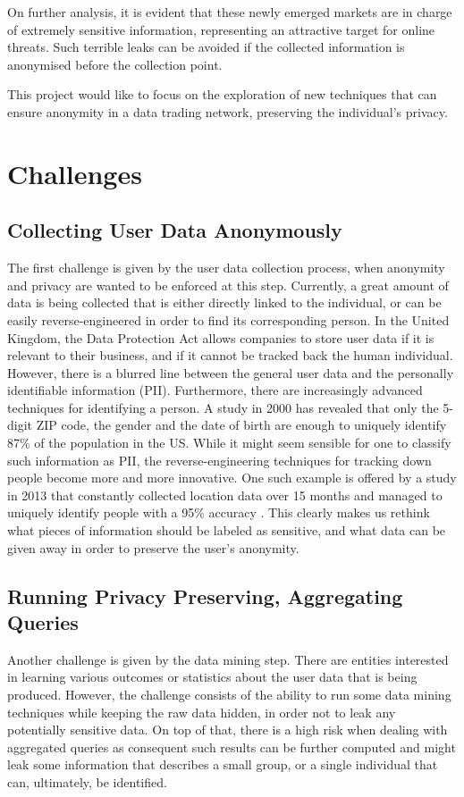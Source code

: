 On further analysis, it is evident that these newly emerged markets are in charge of extremely sensitive information, representing an attractive target for online threats. Such terrible leaks can be avoided if the collected information is anonymised before the collection point.

This project would like to focus on the exploration of new techniques that can ensure anonymity in a data trading network, preserving the individual's privacy.

\section{Challenges}
\subsection{Collecting User Data Anonymously}
The first challenge is given by the user data collection process, when anonymity and privacy are wanted to be enforced at this step.  Currently, a great amount of data is being collected that is either directly linked to the individual, or can be easily reverse-engineered in order to find its corresponding person. In the United Kingdom, the Data Protection Act allows companies to store user data if it is relevant to their business, and if it cannot be tracked back the human individual. However, there is a blurred line between the general user data and the personally identifiable information (PII). Furthermore, there are increasingly advanced techniques for identifying a person. A study in 2000 \cite{sweeney} has revealed that only the 5-digit ZIP code, the gender and the date of birth are enough to uniquely identify 87\% of the population in the US. While it might seem sensible for one to classify such information as PII, the reverse-engineering techniques for tracking down people become more and more innovative. One such example is offered by a study in 2013 that constantly collected location data over 15 months and managed to uniquely identify people with a 95\% accuracy \cite{datalocation}. This clearly makes us rethink what pieces of information should be labeled as sensitive, and what data can be given away in order to preserve the user's anonymity.

\subsection{Running Privacy Preserving, Aggregating Queries}

Another challenge is given by the data mining step. There are entities interested in learning various outcomes or statistics  about the user data that is being produced. However, the challenge consists of the ability to run some data mining techniques while keeping the raw data hidden, in order not to leak any potentially sensitive data. On top of that, there is a high risk when dealing with aggregated queries as consequent such results can be further computed and might leak some information that describes a small group, or a single individual that can, ultimately, be identified.

